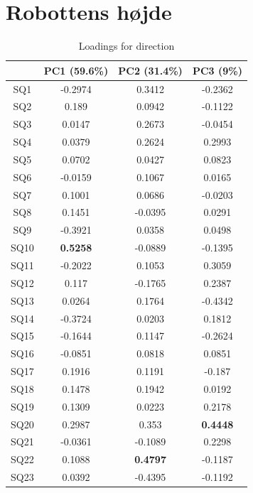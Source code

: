 \section{Robottens højde}
\label{DatabehandlingRHeight}
%

\begin{table}[]
\centering
\begin{tabular}{c|c|c|c}
    & PC1 (59.6\%) & PC2 (31.4\%) & PC3 (9\%) \\ \hline
SQ1  & -0.2974      & 0.3412       & -0.2362   \\ \hline
SQ2  & 0.189        & 0.0942       & -0.1122   \\ \hline
SQ3  & 0.0147       & 0.2673       & -0.0454   \\ \hline
SQ4  & 0.0379       & 0.2624       & 0.2993    \\ \hline
SQ5  & 0.0702       & 0.0427       & 0.0823    \\ \hline
SQ6  & -0.0159      & 0.1067       & 0.0165    \\ \hline
SQ7  & 0.1001       & 0.0686       & -0.0203   \\ \hline
SQ8  & 0.1451       & -0.0395      & 0.0291    \\ \hline
SQ9  & -0.3921      & 0.0358       & 0.0498    \\ \hline
SQ10 & \textbf{0.5258 }      & -0.0889      & -0.1395   \\ \hline
SQ11 & -0.2022      & 0.1053       & 0.3059    \\ \hline
SQ12 & 0.117        & -0.1765      & 0.2387    \\ \hline
SQ13 & 0.0264       & 0.1764       & -0.4342   \\ \hline
SQ14 & -0.3724      & 0.0203       & 0.1812    \\ \hline
SQ15 & -0.1644      & 0.1147       & -0.2624   \\ \hline
SQ16 & -0.0851      & 0.0818       & 0.0851    \\ \hline
SQ17 & 0.1916       & 0.1191       & -0.187    \\ \hline
SQ18 & 0.1478       & 0.1942       & 0.0192    \\ \hline
SQ19 & 0.1309       & 0.0223       & 0.2178    \\ \hline
SQ20 & 0.2987       & 0.353        & \textbf{0.4448}    \\ \hline
SQ21 & -0.0361      & -0.1089      & 0.2298    \\ \hline
SQ22 & 0.1088       & \textbf{0.4797}       & -0.1187   \\ \hline
SQ23 & 0.0392       & -0.4395      & -0.1192   \\ 
\end{tabular}
\caption{Loadings for direction}
\label{tab:loadingsDirection}
\end{table}


